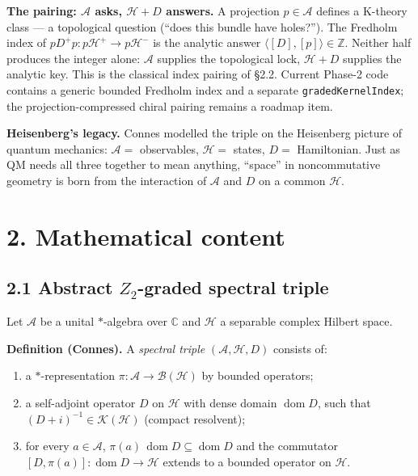 \documentclass[
  11pt,
]{article}
\providecommand{\tightlist}{%
  \setlength{\itemsep}{0pt}\setlength{\parskip}{0pt}}
\begin{document}
\textbf{The pairing: \(\mathcal{A}\) asks, \(\mathcal{H}+ D\) answers.}
A projection \(p \in \mathcal{A}\) defines a K-theory class --- a
topological question (``does this bundle have holes?''). The Fredholm
index of \(p D^+ p \colon p\mathcal{H}^+ \to p\mathcal{H}^-\) is the
analytic answer \(\langle [D], [p]\rangle \in \mathbb{Z}\). Neither half
produces the integer alone: \(\mathcal{A}\) supplies the topological
lock, \(\mathcal{H}+ D\) supplies the analytic key. This is the classical
index pairing of §2.2. Current Phase-2 code contains a generic bounded
Fredholm index and a separate \texttt{gradedKernelIndex}; the
projection-compressed chiral pairing remains a roadmap item.

\textbf{Heisenberg's legacy.} Connes modelled the triple on the
Heisenberg picture of quantum mechanics: \(\mathcal{A}=\) observables,
\(\mathcal{H}=\) states, \(D =\) Hamiltonian. Just as QM needs all three
together to mean anything, ``space'' in noncommutative geometry is born
from the interaction of \(\mathcal{A}\) and \(D\) on a common
\(\mathcal{H}\).

\section{2. Mathematical content}\label{mathematical-content}

\subsection{\texorpdfstring{2.1 Abstract \(Z_2\)-graded spectral
triple}{2.1 Abstract Z\_2-graded spectral triple}}\label{abstract-z_2-graded-spectral-triple}

Let \(\mathcal{A}\) be a unital \(*\)-algebra over \(\mathbb{C}\) and
\(\mathcal{H}\) a separable complex Hilbert space.

\textbf{Definition (Connes).} A \emph{spectral triple}
\((\mathcal{A}, \mathcal{H}, D)\) consists of:

\begin{enumerate}
\def\labelenumi{\arabic{enumi}.}
\tightlist
\item
  a \(*\)-representation
  \(\pi \colon \mathcal{A}\to \mathcal{B}(\mathcal{H})\) by bounded
  operators;
\item
  a self-adjoint operator \(D\) on \(\mathcal{H}\) with dense domain
  \(\mathop{\mathrm{dom}}D\), such that
  \((D+ i)^{-1} \in \mathcal{K}(\mathcal{H})\) (compact resolvent);
\item
  for every \(a \in \mathcal{A}\),
  \(\pi(a)\,\mathop{\mathrm{dom}}D\subseteq \mathop{\mathrm{dom}}D\) and
  the commutator
  \([D, \pi(a)]\colon \mathop{\mathrm{dom}}D\to \mathcal{H}\) extends to
  a bounded operator on \(\mathcal{H}\).
\end{enumerate}
\end{document}
